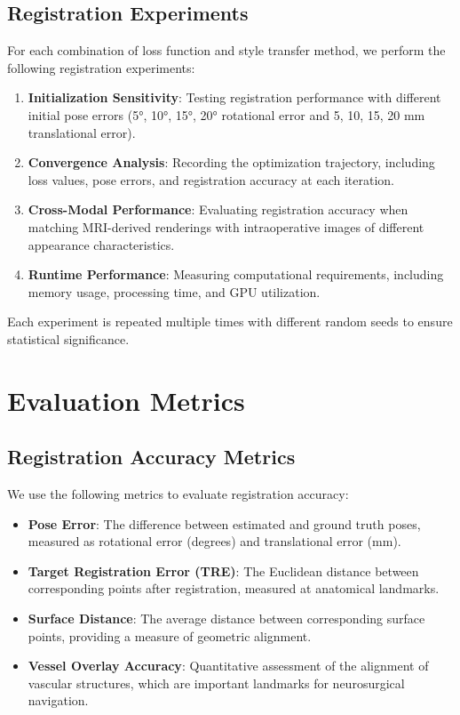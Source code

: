 \subsection{Registration Experiments}

For each combination of loss function and style transfer method, we perform the following registration experiments:

\begin{enumerate}
    \item \textbf{Initialization Sensitivity}: Testing registration performance with different initial pose errors (5°, 10°, 15°, 20° rotational error and 5, 10, 15, 20 mm translational error).
    
    \item \textbf{Convergence Analysis}: Recording the optimization trajectory, including loss values, pose errors, and registration accuracy at each iteration.
    
    \item \textbf{Cross-Modal Performance}: Evaluating registration accuracy when matching MRI-derived renderings with intraoperative images of different appearance characteristics.
    
    \item \textbf{Runtime Performance}: Measuring computational requirements, including memory usage, processing time, and GPU utilization.
\end{enumerate}

Each experiment is repeated multiple times with different random seeds to ensure statistical significance.

\section{Evaluation Metrics}

\subsection{Registration Accuracy Metrics}

We use the following metrics to evaluate registration accuracy:

\begin{itemize}
    \item \textbf{Pose Error}: The difference between estimated and ground truth poses, measured as rotational error (degrees) and translational error (mm).
    
    \item \textbf{Target Registration Error (TRE)}: The Euclidean distance between corresponding points after registration, measured at anatomical landmarks.
    
    \item \textbf{Surface Distance}: The average distance between corresponding surface points, providing a measure of geometric alignment.
    
    \item \textbf{Vessel Overlay Accuracy}: Quantitative assessment of the alignment of vascular structures, which are important landmarks for neurosurgical navigation.
\end{itemize}

